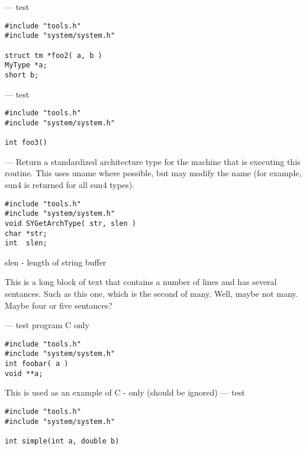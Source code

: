 \endmanpage
\startmanpage
{}
--- test  
\startvb\begin{verbatim}
#include "tools.h"
#include "system/system.h"

struct tm *foo2( a, b )
MyType *a;
short b;
\end{verbatim}
\endvb

\endmanpage
\startmanpage
{}
--- test 
\startvb\begin{verbatim}
#include "tools.h"
#include "system/system.h"

int foo3()
\end{verbatim}
\endvb

\endmanpage
\startmanpage
{}
--- Return a standardized architecture type for the machine that is executing this routine.  This uses uname where possible, but may modify the name (for example, sun4 is returned for all sun4 types). 
\startvb\begin{verbatim}
#include "tools.h"
#include "system/system.h"
void SYGetArchType( str, slen )
char *str;
int  slen;
\end{verbatim}
\endvb

slen - length of string buffer
\par
{}
This is a long block of text that contains a number of lines
and has several sentances.  Such as this one, which is the
second of many.  Well, maybe not many.  Maybe four or
five sentances?
\par
{}
\endmanpage
\startmanpage
{}
--- test program C only 
\startvb\begin{verbatim}
#include "tools.h"
#include "system/system.h"
int foobar( a )
void **a;
\end{verbatim}
\endvb
This is used as an example of C - only (should be ignored)
\endmanpage
\startmanpage
{}
--- test 
\startvb\begin{verbatim}
#include "tools.h"
#include "system/system.h"

int simple(int a, double b)
\end{verbatim}
\endvb

